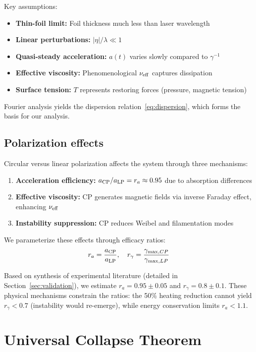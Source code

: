 \documentclass[aps,pre,twocolumn,showpacs,superscriptaddress]{revtex4-2}
\theoremstyle{definition}
\begin{document}
Key assumptions:
\begin{itemize}
\item \textbf{Thin-foil limit:} Foil thickness much less than laser wavelength
\item \textbf{Linear perturbations:} $|\eta|/\lambda \ll 1$
\item \textbf{Quasi-steady acceleration:} $a(t)$ varies slowly compared to $\gamma^{-1}$
\item \textbf{Effective viscosity:} Phenomenological $\nu_{\rm eff}$ captures dissipation
\item \textbf{Surface tension:} $T$ represents restoring forces (pressure, magnetic tension)
\end{itemize}

Fourier analysis yields the dispersion relation~\eqref{eq:dispersion}, which forms the basis for our analysis.

\subsection{Polarization effects}

Circular versus linear polarization affects the system through three mechanisms:

\begin{enumerate}
\item \textbf{Acceleration efficiency:} $a_{\rm CP}/a_{\rm LP} = r_a \approx 0.95$ due to absorption differences
\item \textbf{Effective viscosity:} CP generates magnetic fields via inverse Faraday effect, enhancing $\nu_{\rm eff}$
\item \textbf{Instability suppression:} CP reduces Weibel and filamentation modes
\end{enumerate}

We parameterize these effects through efficacy ratios:
\begin{equation}
r_a = \frac{a_{\rm CP}}{a_{\rm LP}}, \quad r_\gamma = \frac{\gamma_{\max,CP}}{\gamma_{\max,LP}}
\end{equation}

Based on synthesis of experimental literature (detailed in Section~\ref{sec:validation}), we estimate $r_a = 0.95 \pm 0.05$ and $r_\gamma = 0.8 \pm 0.1$. These physical mechanisms constrain the ratios: the 50\% heating reduction cannot yield $r_\gamma < 0.7$ (instability would re-emerge), while energy conservation limits $r_a < 1.1$.

\section{Universal Collapse Theorem}\label{sec:collapse}
\end{document}
